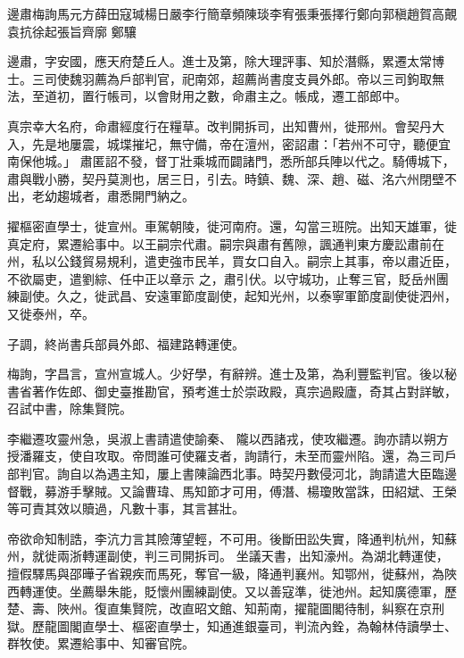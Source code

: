 
\begin{pinyinscope}

 邊肅梅詢馬元方薛田寇瑊楊日嚴李行簡章頻陳琰李宥張秉張擇行鄭向郭稹趙賀高覿袁抗徐起張旨齊廓
 鄭驤



 邊肅，字安國，應天府楚丘人。進士及第，除大理評事、知於潛縣，累遷太常博士。三司使魏羽薦為戶部判官，祀南郊，超薦尚書度支員外郎。帝以三司鉤取無法，至道初，置行帳司，以會財用之數，命肅主之。帳成，遷工部郎中。



 真宗幸大名府，命肅經度行在糧草。改判開拆司，出知曹州，徙邢州。會契丹大入，先是地屢震，城堞摧圮，無守備，帝在澶州，密詔肅：「若州不可守，聽便宜南保他城。」
 肅匿詔不發，督丁壯乘城而闢諸門，悉所部兵陣以代之。騎傅城下，肅與戰小勝，契丹莫測也，居三日，引去。時鎮、魏、深、趙、磁、洺六州閉壁不出，老幼趨城者，肅悉開門納之。



 擢樞密直學士，徙宣州。車駕朝陵，徙河南府。還，勾當三班院。出知天雄軍，徙真定府，累遷給事中。以王嗣宗代肅。嗣宗與肅有舊隙，諷通判東方慶訟肅前在州，私以公錢貿易規利，遣吏強市民羊，買女口自入。嗣宗上其事，帝以肅近臣，不欲屬吏，遣劉綜、任中正以章示
 之，肅引伏。以守城功，止奪三官，貶岳州團練副使。久之，徙武昌、安遠軍節度副使，起知光州，以泰寧軍節度副使徙泗州，又徙泰州，卒。



 子調，終尚書兵部員外郎、福建路轉運使。



 梅詢，字昌言，宣州宣城人。少好學，有辭辨。進士及第，為利豐監判官。後以秘書省著作佐郎、御史臺推勘官，預考進士於崇政殿，真宗過殿廬，奇其占對詳敏，召試中書，除集賢院。



 李繼遷攻靈州急，吳淑上書請遣使諭秦、
 隴以西諸戎，使攻繼遷。詢亦請以朔方授潘羅支，使自攻取。帝問誰可使羅支者，詢請行，未至而靈州陷。還，為三司戶部判官。詢自以為遇主知，屢上書陳論西北事。時契丹數侵河北，詢請遣大臣臨邊督戰，募游手擊賊。又論曹瑋、馬知節才可用，傅潛、楊瓊敗當誅，田紹斌、王榮等可責其效以贖過，凡數十事，其言甚壯。



 帝欲命知制誥，李沆力言其險薄望輕，不可用。後斷田訟失實，降通判杭州，知蘇州，就徙兩浙轉運副使，判三司開拆司。
 坐議天書，出知濠州。為湖北轉運使，擅假驛馬與邵曄子省親疾而馬死，奪官一級，降通判襄州。知鄂州，徙蘇州，為陜西轉運使。坐薦舉朱能，貶懷州團練副使。又以善寇準，徙池州。起知廣德軍，歷楚、壽、陜州。復直集賢院，改直昭文館、知荊南，擢龍圖閣待制，糾察在京刑獄。歷龍圖閣直學士、樞密直學士，知通進銀臺司，判流內銓，為翰林侍讀學士、群牧使。累遷給事中、知審官院。




\end{pinyinscope}
